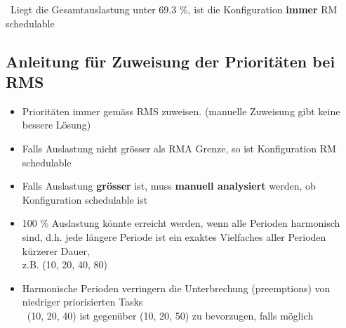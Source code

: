 \textrightarrow\ Liegt die Gesamtauslastung unter $69.3$ \%, ist die Konfiguration \textbf{immer} RM schedulable


\subsection{Anleitung für Zuweisung der Prioritäten bei RMS}

\begin{itemize}
    \item Prioritäten immer gemäss RMS zuweisen. (manuelle Zuweisung gibt keine bessere Lösung)
    \item Falls Auslastung nicht grösser als RMA Grenze, so ist Konfiguration RM schedulable
    \item Falls Auslastung \textbf{grösser} ist, muss \textbf{manuell analysiert} werden, ob Konfiguration schedulable ist
    \item 100 \% Auslastung könnte erreicht werden, wenn alle Perioden harmonisch sind, d.h. jede längere Periode ist ein exaktes
        Vielfaches aller Perioden kürzerer Dauer, \\
        z.B. (10, 20, 40, 80)
    \item Harmonische Perioden verringern die Unterbrechung (preemptions) von niedriger priorisierten Tasks \\
        \textrightarrow\ (10, 20, 40) ist gegenüber (10, 20, 50) zu bevorzugen, falls möglich
\end{itemize}

